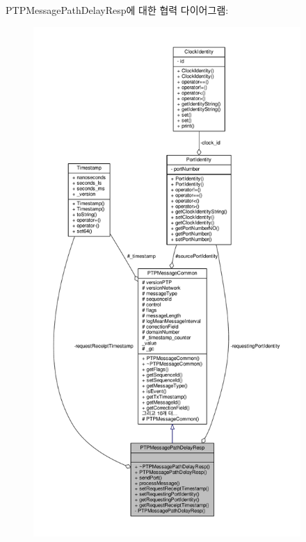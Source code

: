 P\+T\+P\+Message\+Path\+Delay\+Resp에 대한 협력 다이어그램\+:
\nopagebreak
\begin{figure}[H]
\begin{center}
\leavevmode
\includegraphics[height=550pt]{class_p_t_p_message_path_delay_resp__coll__graph}
\end{center}
\end{figure}
